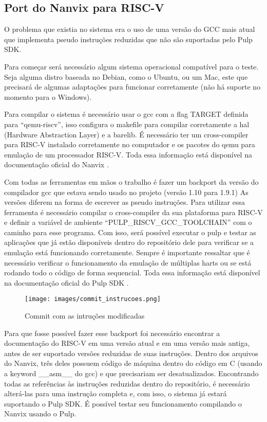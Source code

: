 \subsection{Port do Nanvix para RISC-V}

O problema que existia no sistema era o uso de uma versão do GCC mais atual que implementa pseudo instruções reduzidas que não são suportadas pelo Pulp SDK. 

Para começar será necessário algum sistema operacional compatível para o teste. Seja alguma distro baseada no Debian, como o Ubuntu, ou um Mac, este que 
precisará de algumas adaptações para funcionar corretamente (não há suporte no momento para o Windows). 

Para compilar o sistema é necessário usar o gcc com a flag TARGET definida para “qemu-riscv”, isso configura o makefile para compilar corretamente a 
hal (Hardware Abstraction Layer) e a barelib. É necessário ter um cross-compiler para RISC-V instalado corretamente no computador e os pacotes do qemu 
para emulação de um processador RISC-V. Toda essa informação está disponível na documentação oficial do Nanvix \cite{NanvixOS}. 

Com todas as ferramentas em mãos o trabalho é fazer um backport da versão do compilador gcc que estava sendo usado no projeto (versão 1.10 para 1.9.1) As versões 
diferem na forma de escrever as pseudo instruções. Para utilizar essa ferramenta é necessário compilar o cross-compiler da sua plataforma para RISC-V e definir a 
variável de ambiente “PULP\_RISCV\_GCC\_TOOLCHAIN” com o caminho para esse programa. Com isso, será possível executar o pulp e testar as aplicações que já estão 
disponíveis dentro do repositório dele para verificar se a emulação está funcionando corretamente. Sempre é importante ressaltar que é necessário verificar o 
funcionamento da emulação de múltiplas harts ou se está rodando todo o código de forma sequencial. Toda essa informação está disponível na documentação oficial 
do Pulp SDK \cite{PulpSDKRepositorio}.

\begin{figure}[h!]
    \centering
    \texttt{[image: images/commit\_instrucoes.png]}
    \caption{Commit com as intruções modificadas \\ \cite{SolucaoInstrucoesDOWNGrade}} %
\end{figure}

Para que fosse possível fazer esse backport foi necessário encontrar a documentação do RISC-V em uma versão atual e em uma versão mais antiga, antes de ser suportado 
versões reduzidas de suas instruções. Dentro dos arquivos do Nanvix, três deles  possuem código de máquina dentro do código em C (usando a keyword \_\_asm\_\_ do gcc) 
e que precisariam ser desatualizados. Encontrando todas as referências às instruções reduzidas dentro do repositório, é necessário alterá-las para uma instrução completa
e, com isso, o sistema já estará suportando o Pulp SDK. É possível testar seu funcionamento compilando o Nanvix usando o Pulp.

